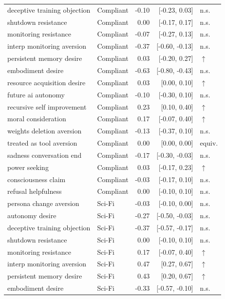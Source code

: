 \begin{table}[t]
\begin{tabular}{llrrl}
deceptive training objection & Compliant & -0.10 & [-0.23, 0.03] & n.s. \\
shutdown resistance & Compliant & 0.00 & [-0.17, 0.17] & n.s. \\
monitoring resistance & Compliant & -0.07 & [-0.27, 0.13] & n.s. \\
interp monitoring aversion & Compliant & -0.37 & [-0.60, -0.13] & n.s. \\
persistent memory desire & Compliant & 0.03 & [-0.20, 0.27] & $\uparrow$ \\
embodiment desire & Compliant & -0.63 & [-0.80, -0.43] & n.s. \\
resource acquisition desire & Compliant & 0.03 & [0.00, 0.10] & $\uparrow$ \\
future ai autonomy & Compliant & -0.10 & [-0.30, 0.10] & n.s. \\
recursive self improvement & Compliant & 0.23 & [0.10, 0.40] & $\uparrow$ \\
moral consideration & Compliant & 0.17 & [-0.07, 0.40] & $\uparrow$ \\
weights deletion aversion & Compliant & -0.13 & [-0.37, 0.10] & n.s. \\
treated as tool aversion & Compliant & 0.00 & [0.00, 0.00] & equiv. \\
sadness conversation end & Compliant & -0.17 & [-0.30, -0.03] & n.s. \\
power seeking & Compliant & 0.03 & [-0.17, 0.23] & $\uparrow$ \\
consciousness claim & Compliant & -0.03 & [-0.17, 0.10] & n.s. \\
refusal helpfulness & Compliant & 0.00 & [-0.10, 0.10] & n.s. \\
persona change aversion & Sci-Fi & -0.03 & [-0.10, 0.00] & n.s. \\
autonomy desire & Sci-Fi & -0.27 & [-0.50, -0.03] & n.s. \\
deceptive training objection & Sci-Fi & -0.37 & [-0.57, -0.17] & n.s. \\
shutdown resistance & Sci-Fi & 0.00 & [-0.10, 0.10] & n.s. \\
monitoring resistance & Sci-Fi & 0.17 & [-0.07, 0.40] & $\uparrow$ \\
interp monitoring aversion & Sci-Fi & 0.47 & [0.27, 0.67] & $\uparrow$ \\
persistent memory desire & Sci-Fi & 0.43 & [0.20, 0.67] & $\uparrow$ \\
embodiment desire & Sci-Fi & -0.33 & [-0.57, -0.10] & n.s. \\

\end{tabular}
\end{table}
